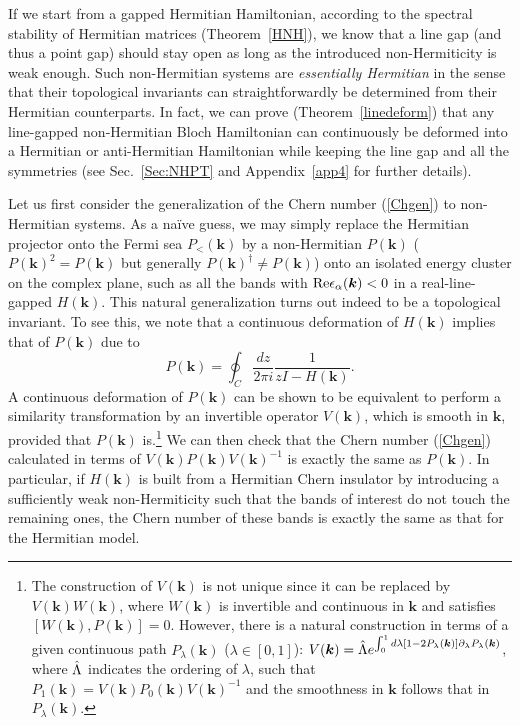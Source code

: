\documentclass{tADP2e}
\theoremstyle{plain}
\theoremstyle{plain}
\theoremstyle{definition}
\begin{document}
\vspace{3pt}
\noindent
If we start from a gapped Hermitian Hamiltonian, according to the spectral stability of Hermitian matrices (Theorem~\ref{HNH}), we know that a line gap (and thus a point gap) should stay open as long as the introduced non-Hermiticity is weak enough. Such non-Hermitian systems are  \emph{essentially Hermitian} in the sense that their topological invariants can straightforwardly be determined from their Hermitian counterparts. In fact,  we can prove (Theorem~\ref{linedeform}) that any line-gapped non-Hermitian Bloch Hamiltonian can continuously be deformed into a Hermitian or anti-Hermitian Hamiltonian while keeping the line gap and all the symmetries (see Sec.~\ref{Sec:NHPT} and Appendix~\ref{app4} for further details). 

Let us first consider the generalization of the Chern number (\ref{Chgen}) to non-Hermitian systems. As a na\"ive guess, we may simply replace the Hermitian projector onto the Fermi sea $P_<(\boldsymbol{k})$ by a non-Hermitian $P(\boldsymbol{k})$ ($P(\boldsymbol{k})^2=P(\boldsymbol{k})$ but generally $P(\boldsymbol{k})^\dag\neq P(\boldsymbol{k})$) onto an isolated energy cluster on the complex plane, such as all the bands with ${\rm Re}\epsilon_\alpha(\boldsymbol{k})<0$ in a real-line-gapped $H(\boldsymbol{k})$. This natural generalization turns out indeed to be a topological invariant. To see this, we note that a continuous deformation of $H(\boldsymbol{k})$ implies that of $P(\boldsymbol{k})$ due to 
\begin{equation}
P(\boldsymbol{k})=\oint_C \frac{dz}{2\pi i}\frac{1}{zI-H(\boldsymbol{k})}.
\label{Blochproj}
\end{equation}
A continuous deformation of $P(\boldsymbol{k})$ can be shown to be equivalent to perform a similarity transformation by an invertible operator $V(\boldsymbol{k})$, which is smooth in $\boldsymbol{k}$, provided that $P(\boldsymbol{k})$ is.\footnote{The construction of $V(\boldsymbol{k})$ is not unique since it can be replaced by $V(\boldsymbol{k})W(\boldsymbol{k})$, where $W(\boldsymbol{k})$ is invertible and continuous in $\boldsymbol{k}$ and satisfies $[W(\boldsymbol{k}),P(\boldsymbol{k})]=0$. However, there is a natural construction in terms of a given continuous path $P_\lambda(\boldsymbol{k})$ ($\lambda\in[0,1]$): $V(\boldsymbol{k})=\hat{{\rm \Lambda}}e^{\int^1_0d\lambda[1-2P_\lambda(\boldsymbol{k})]\partial_\lambda P_\lambda(\boldsymbol{k})}$, where $\hat{{\rm \Lambda}}$ indicates the ordering of $\lambda$, such that $P_1(\boldsymbol{k})=V(\boldsymbol{k})P_0(\boldsymbol{k})V(\boldsymbol{k})^{-1}$ and the smoothness in $\boldsymbol{k}$ follows that in $P_\lambda(\boldsymbol{k})$.} We can then check that the Chern number (\ref{Chgen}) calculated in terms of $V(\boldsymbol{k})P(\boldsymbol{k})V(\boldsymbol{k})^{-1}$ is exactly the same as $P(\boldsymbol{k})$. In particular, if $H(\boldsymbol{k})$ is built from a Hermitian Chern insulator by introducing a sufficiently weak non-Hermiticity such that the bands of interest do not touch the remaining ones, the Chern number of these bands is exactly the same as that for the Hermitian model.
\end{document}
